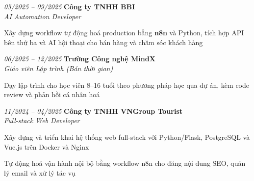 \begin{twocolentry}{\textit{05/2025 -- 09/2025}}
    \textbf{Công ty TNHH BBI} \\[4pt]
    \textit{AI Automation Developer}
\end{twocolentry}
\begin{onecolentry}
    \begin{highlights}
        \item Xây dựng workflow tự động hoá production bằng \textbf{n8n} và Python, tích hợp API bên thứ ba và AI hội thoại cho bán hàng và chăm sóc khách hàng
    \end{highlights}
\end{onecolentry}
\vspace{0.2 cm}

\begin{twocolentry}{\textit{06/2025 -- 12/2025}}
    \textbf{Trường Công nghệ MindX} \\[4pt]
    \textit{Giáo viên Lập trình (Bán thời gian)}
\end{twocolentry}
\begin{onecolentry}
    \begin{highlights}
        \item Dạy lập trình cho học viên 8--16 tuổi theo phương pháp học qua dự án, kèm code review và phản hồi cá nhân hoá
    \end{highlights}
\end{onecolentry}
\vspace{0.2 cm}

\begin{twocolentry}{\textit{11/2024 -- 04/2025}}
    \textbf{Công ty TNHH VNGroup Tourist} \\[4pt]
    \textit{Full-stack Web Developer}
\end{twocolentry}
\begin{onecolentry}
    \begin{highlights}
        \item Xây dựng và triển khai hệ thống web full-stack với Python/Flask, PostgreSQL và Vue.js trên Docker và Nginx
        \item Tự động hoá vận hành nội bộ bằng workflow n8n cho đăng nội dung SEO, quản lý email và xử lý tác vụ
    \end{highlights}
\end{onecolentry}


